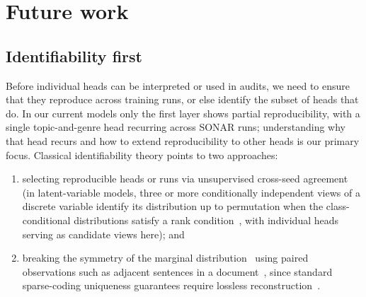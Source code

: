 \section{Future work}
\label{sec:future}

\subsection{Identifiability first}
Before individual heads can be interpreted or used in audits, we need to
ensure that they reproduce across training runs, or else identify the
subset of heads that do. In our current models only the first layer
shows partial reproducibility, with a single topic-and-genre head
recurring across SONAR runs; understanding why that head recurs and how
to extend reproducibility to other heads is our primary focus. Classical
identifiability theory points to two approaches:
\begin{enumerate}
	\item selecting reproducible heads or runs via unsupervised
	cross-seed agreement~\cite{udr2020} (in latent-variable models, three
	or more conditionally independent views of a discrete variable
	identify its distribution up to permutation when the
	class-conditional distributions satisfy a rank
	condition~\cite{allman2009}, with individual heads serving as
	candidate views here); and
	\item breaking the symmetry of the marginal distribution~\cite{locatello2019}
	using paired observations such as adjacent sentences in a
	document~\cite{pcl2017,slowvae2021,locatello2020,ivae2020,zimmermann2021},
	since standard sparse-coding uniqueness guarantees require lossless
	reconstruction~\cite{hillar2015}.
\end{enumerate}

